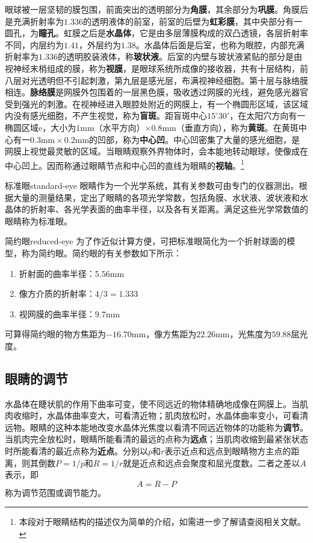 \documentclass[cn,10pt,chinesefont=founder,math=newtx,cite=super,twoside]{elegantbook}
\begin{document}
眼球被一层坚韧的膜包围，前面突出的透明部分为\textbf{角膜}，其余部分为\textbf{巩膜}。角膜后是充满折射率为$1.336$的透明液体的前室，前室的后壁为\textbf{虹彩膜}，其中央部分有一圆孔，为\textbf{瞳孔}。虹膜之后是\textbf{水晶体}，它是由多层薄膜构成的双凸透镜，各层折射率不同，内层约为$1.41$，外层约为$1.38$。水晶体后面是后室，也称为眼腔，内部充满折射率为$1.336$的透明胶装液体，称\textbf{玻状液}。后室的内壁与玻状液紧贴的部分是由视神经末梢组成的膜，称为\textbf{视膜}，是眼球系统所成像的接收器，共有十层结构，前八层对光透明但不引起刺激，第九层是感光层，布满视神经细胞。第十层与脉络膜相连。\textbf{脉络膜}是网膜外包围着的一层黑色膜，吸收透过网膜的光线，避免感光器官受到强光的刺激。在视神经进入眼腔处附近的网膜上，有一个椭圆形区域，该区域内没有感光细胞，不产生视觉，称为\textbf{盲斑}。距盲斑中心$15^{\circ}30'$，在太阳穴方向有一椭圆区域e，大小为$1\mathrm{mm}$（水平方向）$\times0.8\mathrm{mm}$（垂直方向），称为\textbf{黄斑}。在黄斑中心有一$0.3\mathrm{mm}\times0.2\mathrm{mm}$的凹部，称为\textbf{中心凹}。中心凹密集了大量的感光细胞，是网膜上视觉最灵敏的区域。当眼睛观察外界物体时，会本能地转动眼球，使像成在中心凹上。因而称通过眼睛节点和中心凹的直线为眼睛的\textbf{视轴}。\footnote{本段对于眼睛结构的描述仅为简单的介绍，如需进一步了解请查阅相关文献。}

\begin{definition}{标准眼}{standard-eye}
	眼睛作为一个光学系统，其有关参数可由专门的仪器测出。根据大量的测量结果，定出了眼睛的各项光学常数，包括角膜、水状液、波状液和水晶体的折射率、各光学表面的曲率半径，以及各有关距离。满足这些光学常数值的眼睛称为标准眼。
\end{definition}

\begin{definition}{简约眼}{reduced-eye}
	为了作近似计算方便，可把标准眼简化为一个折射球面的模型，称为简约眼。简约眼的有关参数如下所示：
	\begin{enumerate}
		\item 折射面的曲率半径：$5.56\mathrm{mm}$
		\item 像方介质的折射率：$4/3=1.333$
		\item 视网膜的曲率半径：$9.7\mathrm{mm}$
	\end{enumerate}
	可算得简约眼的物方焦距为$-16.70\mathrm{mm}$，像方焦距为$22.26\mathrm{mm}$，光焦度为$59.88$屈光度。
\end{definition}

\subsection{眼睛的调节}
水晶体在睫状肌的作用下曲率可变，使不同远近的物体精确地成像在网膜上。当肌肉收缩时，水晶体曲率变大，可看清近物；肌肉放松时，水晶体曲率变小，可看清远物。眼睛的这种本能地改变水晶体光焦度以看清不同远近物体的功能称为\textbf{调节}。当肌肉完全放松时，眼睛所能看清的最远的点称为\textbf{远点}；当肌肉收缩到最紧张状态时所能看清的最近点称为\textbf{近点}。分别以$p$和$r$表示近点和远点到眼睛物方主点的距离，则其倒数$P=1/p$和$R=1/r$就是近点和远点会聚度和屈光度数。二者之差以$A$表示，即
\begin{equation}
A=R-P
\end{equation}
称为调节范围或调节能力。
\end{document}
